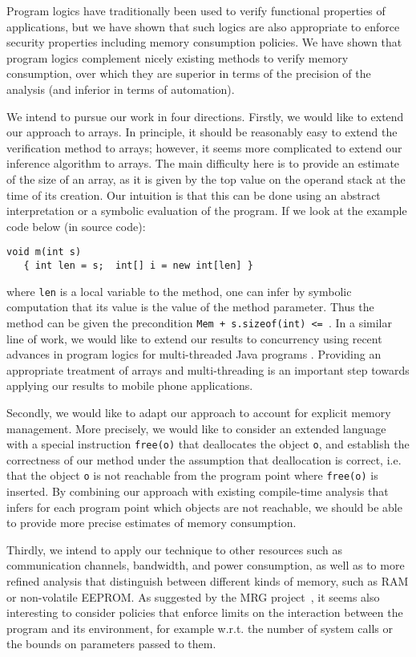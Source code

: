 
Program logics have traditionally been used to verify functional
properties of applications, but we have shown that such logics 
are also appropriate to enforce security properties including
memory consumption policies. We have shown that program logics
complement nicely existing methods to verify memory consumption,
over which they are superior in terms of the precision of the
analysis (and inferior in terms of automation).

We intend to pursue our work in four directions. Firstly, we would
like to extend our approach to arrays. In principle, it should be
reasonably easy to extend the verification method to arrays; however,
it seems more complicated to extend our inference algorithm to arrays.
The main difficulty here is to provide an estimate of the size of an
array, as it is given by the top value on the operand stack at the
time of its creation. Our intuition is that this can be done using
an abstract interpretation or a symbolic evaluation of the program. 
If we look at the example code below (in source code): 
\begin{verbatim}
void m(int s)
   { int len = s;  int[] i = new int[len] } 
\end{verbatim}
where \verb!len! is a local variable to the method, one can infer by
symbolic computation that its value is the value of the method
parameter. Thus the method can be given the precondition \texttt{Mem +
s.sizeof(int) <= \Max}. In a similar line of work, we would like to extend our
results to concurrency using recent advances in program logics for
multi-threaded Java programs \cite{RDFHL05ess}. Providing an appropriate
treatment of arrays and multi-threading is an important step towards
applying our results to mobile phone applications.

Secondly, we would like to adapt our approach to account for explicit
memory management. More precisely, we would like to consider an
extended language with a special instruction \texttt{free(o)} that
deallocates the object \texttt{o}, and establish the correctness of
our method under the assumption that deallocation is correct, i.e.
that the object \texttt{o} is not reachable from the program point
where \texttt{free(o)} is inserted. By combining our approach with
existing compile-time analysis that infers for each program point
which objects are not reachable, we should be able to provide more
precise estimates of memory consumption.

Thirdly, we intend to apply our technique to other resources such as
communication channels, bandwidth, and power consumption, as well as
to more refined analysis that distinguish between different kinds of
memory, such as RAM or non-volatile EEPROM.  As suggested by the MRG
project~\cite{asp+04:cassis}, it seems also interesting to consider
policies that enforce limits on the interaction between the program
and its environment, for example w.r.t. the number of system calls or
the bounds on parameters passed to them.

